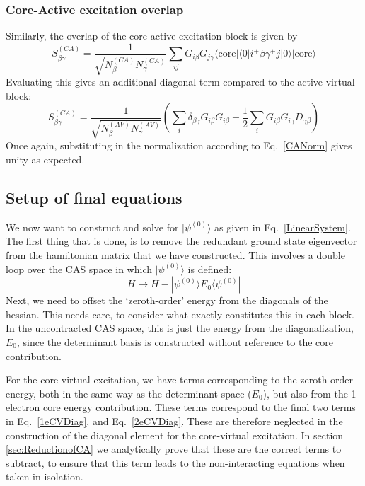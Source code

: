 \documentclass[a4paper,oneside,11pt]{article}
\numberwithin{equation}{section}
\newcommand{\DMETBra}{\langle \mathrm{core}|\langle 0|}
\newcommand{\DMETKet}{|0\rangle| \mathrm{core} \rangle}
\begin{document}
\subsubsection{Core-Active excitation overlap}
Similarly, the overlap of the core-active excitation block is given by
\begin{equation}
S^{(CA)}_{\beta \gamma} = \frac{1}{\sqrt{N^{(CA)}_{\beta} N^{(CA)}_{\gamma}}} \sum_{ij} G_{i \beta} G_{j \gamma} \DMETBra i^{+} \beta \gamma^{+} j \DMETKet
\end{equation}
Evaluating this gives an additional diagonal term compared to the active-virtual block:
\begin{equation}
S^{(CA)}_{\beta \gamma} = \frac{1}{\sqrt{N^{(AV)}_{\beta} N^{(AV)}_{\gamma}}} \left ( \sum_i \delta_{\beta \gamma} G_{i \beta} G_{i \beta} - \frac{1}{2} \sum_{i} G_{i \beta} G_{i \gamma} D_{\gamma \beta} \right)
\end{equation}
Once again, substituting in the normalization according to Eq.~\ref{CANorm} gives unity as expected.

\subsection{Setup of final equations}

We now want to construct and solve for $|\psi^{(0)} \rangle$ as given in Eq.~\ref{LinearSystem}. The first thing that is done, is to remove the redundant ground state eigenvector from the hamiltonian
matrix that we have constructed. This involves a double loop over the CAS space in which $|\psi^{(0)} \rangle$ is defined:
\begin{equation}
H \rightarrow H - |\psi^{(0)} \rangle E_0 \langle \psi^{(0)} |
\end{equation}
Next, we need to offset the `zeroth-order' energy from the diagonals of the hessian. This needs care, to consider what exactly constitutes this in each block. In the uncontracted CAS space, this is 
just the energy from the diagonalization, $E_0$, since the determinant basis is constructed without reference to the core contribution.

For the core-virtual excitation, we have terms corresponding to the zeroth-order energy, both in the same way as the determinant space ($E_0$), but also from the 1-electron core energy contribution.
These terms correspond to the final two terms in Eq.~\ref{1eCVDiag}, and Eq.~\ref{2eCVDiag}. These are therefore neglected in the construction of the diagonal element for the core-virtual excitation. In 
section \ref{sec:ReductionofCA} we analytically prove that these are the correct terms to subtract, to ensure that this term leads to the non-interacting equations when taken in isolation.
\end{document}
